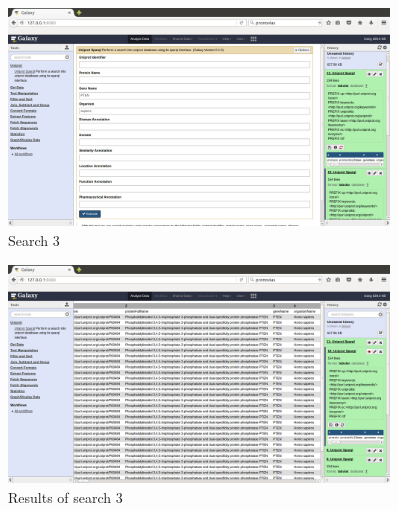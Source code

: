 \documentclass[12pt]{article}
\begin{document}
\begin{figure}[h]
	\includegraphics[width=0.9\textwidth]{figures/3a}
	\caption{Search 3}
	\label{fig:example_3a}
\end{figure}
\begin{figure}[h]
	\includegraphics[width=0.9\textwidth]{figures/3b}
	\caption{Results of search 3}
	\label{fig:example_3b}
\end{figure}
\end{document}
